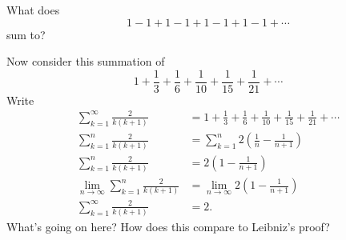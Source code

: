 \documentclass[nooutcomes]{ximera}
\begin{document}
\begin{question}
What does
\[
1-1+1-1+1-1+1-1+\cdots
\]
sum to?
\end{question}

\begin{question}
Now consider this summation of 
\[
1+ \frac{1}{3} + \frac{1}{6} + \frac{1}{10} + \frac{1}{15} + \frac{1}{21} + \cdots
\]
Write
\begin{align*}
\sum_{k=1}^\infty \frac{2}{k(k+1)} &= 1+ \frac{1}{3} + \frac{1}{6} + \frac{1}{10} + \frac{1}{15} + \frac{1}{21} + \cdots \\
\sum_{k=1}^n \frac{2}{k(k+1)} &= \sum_{k=1}^n 2\left(\frac{1}{n}- \frac{1}{n+1}\right)\\
\sum_{k=1}^n \frac{2}{k(k+1)} &= 2\left(1 - \frac{1}{n+1}\right)\\
\lim_{n\to \infty} \sum_{k=1}^n \frac{2}{k(k+1)} &= \lim_{n\to \infty}2\left(1 - \frac{1}{n+1}\right)\\
\sum_{k=1}^\infty \frac{2}{k(k+1)} &= 2.
\end{align*}
What's going on here? How does this compare to Leibniz's proof?
\end{question}

\end{document}

